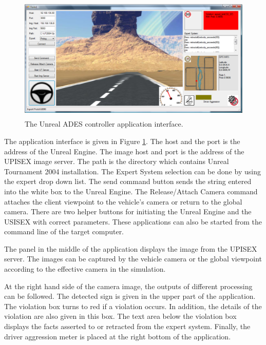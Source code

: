 \documentclass[a4paper,oneside,12pt]{report}
\begin{document}
\begin{figure}[ht]
\begin{center}
\includegraphics[width=150mm,height=60mm]{img/ADESController.eps}
\caption{The Unreal ADES controller application interface.}
\label{fig:ADESController}
\end{center}
\end{figure}

The application interface is given in Figure \ref{fig:ADESController}. The host and the port is the address of the Unreal Engine. The image host and port is the address of the UPISEX image server. The path is the directory which contains Unreal Tournament 2004 installation. The Expert System selection can be done by using the expert drop down list. The send command button sends the string entered into the white box to the Unreal Engine. The Release/Attach Camera command attaches the client viewpoint to the vehicle's camera or return to the global camera. There are two helper buttons for initiating the Unreal Engine and the USISEX with correct parameters. These applications can also be started from the command line of the target computer.

The panel in the middle of the application displays the image from the UPISEX server. The images can be captured by the vehicle camera or the global viewpoint according to the effective camera in the simulation.

At the right hand side of the camera image, the outputs of different processing can be followed. The detected sign is given in the upper part of the application. The violation box turns to red if a violation occurs. In addition, the details of the violation are also given in this box. The text area below the violation box displays the facts asserted to or retracted from the expert system. Finally, the driver aggression meter is placed at the right bottom of the application.
\end{document}
